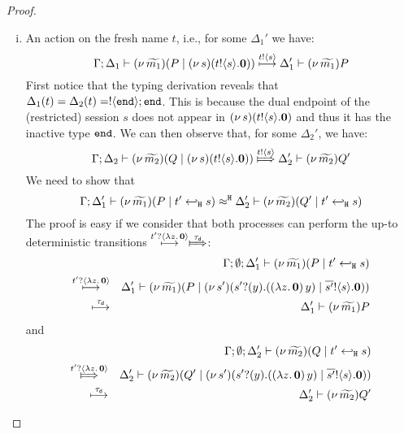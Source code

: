 \begin{proof}
\begin{enumerate}[$-$]
\begin{enumerate}[a)]
\begin{enumerate}[i)]
					\item An action on the fresh name $t$, i.e., for some $\Delta_1'$ we have:
					\[
								\Gamma; \Delta_1 \vdash (\nu\, \widetilde{m_1})(P \;|\; (\nu\, s)(t ! \langle s \rangle . \mathbf{0})  )  \stackrel{t ! \langle s \rangle}{\longmapsto}  \Delta_1' \vdash (\nu\, \widetilde{m_1}) P
							\]
							First notice that the typing derivation
							reveals that $\Delta_1(t) = \Delta_2(t) = ! \langle \mathtt{end} \rangle ; \mathtt{end}$.
							This is because the dual endpoint of the (restricted) session $s$ does not appear
							in $(\nu\, s)(t ! \langle s \rangle . \mathbf{0})$ and thus it has the inactive type $\mathtt{end}$.
							We can then observe that,  for some $\Delta_2'$, we have:
							\[
								\horel{\Gamma}{\Delta_2}{\newsp{\widetilde{m_2}}{Q \Par \newsp{s}{\bout{t}{s} \inact}  } }
								{\Hby{\bactout{t}{s}} }
								{\Delta_2'}{\news{\widetilde{m_2}} Q'}
							\]
							We need to show that
							\[
								\Gamma; \Delta_1' \vdash (\nu\, \widetilde{m_1})(P \;|\; t' \hookleftarrow_{\mathtt{H}} s  )  \approx^\mathtt{H} \Delta_2' \vdash (\nu\, \widetilde{m_2})(Q' \;|\; t' \hookleftarrow_{\mathtt{H}} s  )
							\]
							The proof is easy if we consider that both processes can perform the
							up-to deterministic transitions $\hby{\bactinp{t'}{\abs{z}{\inact}}} \Hby{\dtau}$:
							\begin{eqnarray*}
								&&\Gamma; \emptyset; \Delta_1' \vdash (\nu\, \widetilde{m_1})(P \;|\; t' \hookleftarrow_{\mathtt{H}} s  ) \\
								\stackrel{t' ? \langle \lambda z.\,\mathbf{0} \rangle}{\longmapsto} &&
								\Delta_1' \vdash (\nu\, \widetilde{m_1})(P \;|\; (\nu\, s')(s' ? (y) . ((\lambda z.\,\mathbf{0})\, {y}) \;|\; \overline{s'} ! \langle s \rangle . \mathbf{0}))
								\\
								\stackrel{\tau_{\mathsf{d}}}{\longmapsto} &&
								\Delta_1' \vdash (\nu\, \widetilde{m_1}){P}
							\end{eqnarray*}
							and
							\begin{eqnarray*}
								&&\Gamma; \es; \Delta_2' \proves \newsp{\widetilde{m_2}}{Q \Par \htrigger{t'}{s}  } \\
								\Hby{\bactinp{t'}{\abs{z}{\inact}}} &&
								\Delta_2' \proves \newsp{\widetilde{m_2}}{Q' \Par \newsp{s'}{\binp{s'}{y} (\appl{(\abs{z}{\inact})}{y}) \Par \bout{\dual{s'}}{s} \inact}}
								\\
								\hby{\dtau} &&
								\Delta_2' \proves \news{\widetilde{m_2}}{Q'}
							\end{eqnarray*}

\end{enumerate}
\end{enumerate}
\end{enumerate}
\end{proof}

